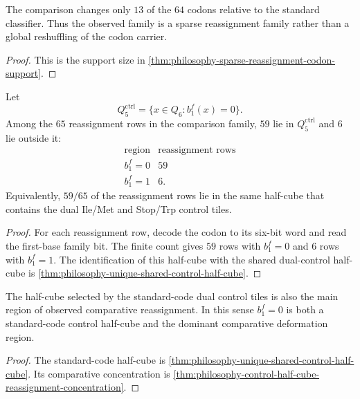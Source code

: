 \begin{corollary}
\label{cor:philosophy-comparative-variation-sparse}
The comparison changes only $13$ of the $64$ codons relative to the
standard classifier. Thus the observed family is a sparse reassignment
family rather than a global reshuffling of the codon carrier.
\end{corollary}
\begin{proof}
This is the support size in
\autoref{thm:philosophy-sparse-reassignment-codon-support}.
\end{proof}

\begin{theorem}
\label{thm:philosophy-control-half-cube-reassignment-concentration}
Let
$$
  Q_{5}^{\mathrm{ctrl}}=\{x\in Q_{6}:b_{1}^{f}(x)=0\}.
$$
Among the $65$ reassignment rows in the comparison family, $59$ lie in
$Q_{5}^{\mathrm{ctrl}}$ and $6$ lie outside it:
$$
\begin{array}{c|r}
  \text{region} & \text{reassignment rows}\\
\hline
  b_{1}^{f}=0 & 59\\
  b_{1}^{f}=1 & 6.
\end{array}
$$
Equivalently, $59/65$ of the reassignment rows lie in the same
half-cube that contains the dual Ile/Met and Stop/Trp control tiles.
\end{theorem}
\begin{proof}
For each reassignment row, decode the codon to its six-bit word and
read the first-base family bit. The finite count gives $59$ rows with
$b_{1}^{f}=0$ and $6$ rows with $b_{1}^{f}=1$. The identification of
this half-cube with the shared dual-control half-cube is
\autoref{thm:philosophy-unique-shared-control-half-cube}.
\end{proof}

\begin{corollary}
\label{cor:philosophy-shared-half-cube-comparative-working-region}
The half-cube selected by the standard-code dual control tiles is also
the main region of observed comparative reassignment. In this sense
$b_{1}^{f}=0$ is both a standard-code control half-cube and the
dominant comparative deformation region.
\end{corollary}
\begin{proof}
The standard-code half-cube is
\autoref{thm:philosophy-unique-shared-control-half-cube}. Its
comparative concentration is
\autoref{thm:philosophy-control-half-cube-reassignment-concentration}.
\end{proof}

